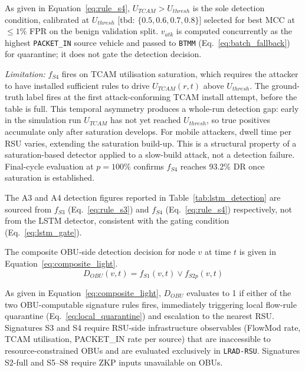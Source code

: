 \documentclass[12pt, a4paper]{report}
\begin{document}
As given in Equation~\eqref{eq:rule_s4}, $U_{TCAM}>
U_{thresh}$ is the sole detection condition, calibrated
at $U_{thresh}$ [tbd: $\{0.5, 0.6, 0.7, 0.8\}$]
selected for best \ac{MCC} at $\leq 1\%$ \ac{FPR} on
the benign validation split. $v_{atk}$ is computed
concurrently as the highest \texttt{PACKET\_IN} source
vehicle and passed to \texttt{BTMM}
(Eq.~\ref{eq:batch_fallback}) for quarantine; it does
not gate the detection decision.

\textit{Limitation:}
$f_{S4}$ fires on \ac{TCAM} utilisation saturation,
which requires the attacker to have installed
sufficient rules to drive $U_{TCAM}(r,t)$ above
$U_{thresh}$. The ground-truth label fires at the
first attack-conforming \ac{TCAM} install attempt,
before the table is full. This temporal asymmetry
produces a whole-run detection gap: early in the
simulation run $U_{TCAM}$ has not yet reached
$U_{thresh}$, so true positives accumulate only
after saturation develops. For mobile attackers,
dwell time per \ac{RSU} varies, extending the
saturation build-up. This is a structural property
of a saturation-based detector applied to a
slow-build attack, not a detection failure. Final-cycle
evaluation at $p=100\%$ confirms $f_{S4}$ reaches
93.2\% \ac{DR} once saturation is established.

The A3 and A4 detection figures reported in
Table~\ref{tab:lstm_detection} are sourced from
$f_{S3}$ (Eq.~\ref{eq:rule_s3}) and $f_{S4}$
(Eq.~\ref{eq:rule_s4}) respectively, not from the
\ac{LSTM} detector, consistent with the gating
condition (Eq.~\ref{eq:lstm_gate}).

The composite \ac{OBU}-side detection decision for
node $v$ at time $t$ is given in
Equation~\eqref{eq:composite_light}.
\begin{equation}
D_{OBU}(v,t) = f_{S1}(v,t) \lor f_{S2p}(v,t)
\label{eq:composite_light}
\end{equation}

As given in Equation~\eqref{eq:composite_light},
$D_{OBU}$ evaluates to 1 if either of the two
\ac{OBU}-computable signature rules fires,
immediately triggering local flow-rule quarantine
(Eq.~\ref{eq:local_quarantine}) and escalation to
the nearest \ac{RSU}. Signatures S3 and S4 require
\ac{RSU}-side infrastructure observables (FlowMod
rate, TCAM utilisation, PACKET\_IN rate per source)
that are inaccessible to resource-constrained \ac{OBU}s
and are evaluated exclusively in \texttt{LRAD-RSU}.
Signatures S2-full and S5--S8 require \ac{ZKP}
inputs unavailable on \ac{OBU}s.
\end{document}
